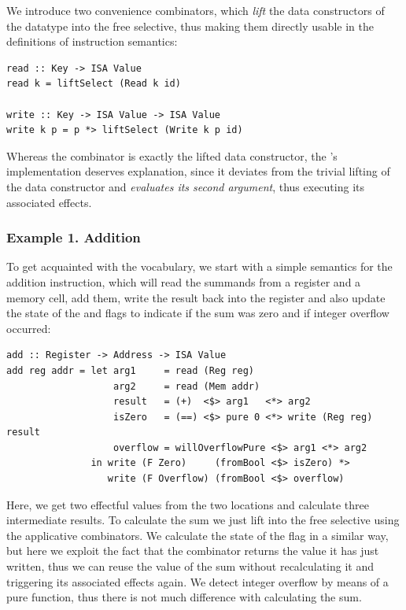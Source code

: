 We introduce two convenience combinators, which \emph{lift} the data constructors
of the  datatype into the free selective, thus making them directly usable in
the definitions of instruction semantics:

\begin{verbatim}
read :: Key -> ISA Value
read k = liftSelect (Read k id)

write :: Key -> ISA Value -> ISA Value
write k p = p *> liftSelect (Write k p id)
\end{verbatim}

Whereas the  combinator is exactly the lifted  data constructor,
the 's implementation deserves explanation, since it deviates from the trivial
lifting of the  data constructor and \emph{evaluates its second argument},
thus executing its associated effects.

\subsubsection{\textbf{Example 1. Addition}}

To get acquainted with the vocabulary, we start with a simple semantics for
the addition instruction, which will read the summands from a register and a memory cell,
add them, write the result back into the register and also update the state of the 
and  flags to indicate if the sum was zero and if integer overflow occurred:

\begin{verbatim}
add :: Register -> Address -> ISA Value
add reg addr = let arg1     = read (Reg reg)
                   arg2     = read (Mem addr)
                   result   = (+)  <$> arg1   <*> arg2
                   isZero   = (==) <$> pure 0 <*> write (Reg reg) result
                   overflow = willOverflowPure <$> arg1 <*> arg2
               in write (F Zero)     (fromBool <$> isZero) *>
                  write (F Overflow) (fromBool <$> overflow)
\end{verbatim}

Here, we get two effectful values from the two locations and calculate three intermediate
results. To calculate the sum we just lift \hs{+} into the free selective using the applicative
combinators. We calculate the state of the  flag in a similar way, but here we
exploit the fact that the  combinator returns the value it has just written, thus we
can reuse the value of the sum without recalculating it and triggering its associated effects
again. We detect integer overflow by means of a pure function, thus there is not much difference
with calculating the sum.

